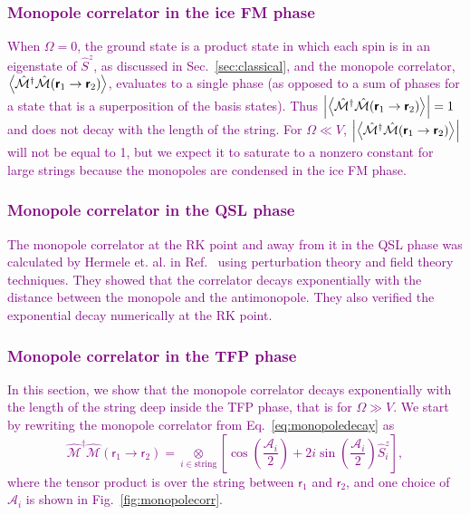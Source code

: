 \documentclass[twocolumn,superscriptaddress,amsmath,amssymb,aps,prx,nofootinbib]{revtex4-2}
\newcommand{\dual}[1]{\boldsymbol{\mathsf{#1}}}
\newcommand{\newtext}[1]{\textcolor{purple}{#1}}
\begin{document}
\newtext{\subsubsection{Monopole correlator in the ice FM phase}} \label{sec:monopole_corr_ice_fm}

\newtext{When $\Omega = 0$, the ground state is a product state in which each spin is in an eigenstate of $\hat{S}^z$, as discussed in Sec.~\ref{sec:classical}, and the monopole correlator, $\expval{\hat{\mathcal{M}}^\dagger \hat{\mathcal{M}} (\dual{r}_1 \rightarrow \dual{r}_2) }$, evaluates to a single phase (as opposed to a sum of phases for a state that is a superposition of the basis states). Thus $\abs{\expval{\hat{\mathcal{M}}^\dagger \hat{\mathcal{M}} (\dual{r}_1 \rightarrow \dual{r}_2) }} = 1$ and does not decay with the length of the string. For $\Omega \ll V$, $\abs{ \expval{\hat{\mathcal{M}}^\dagger \hat{\mathcal{M}} (\dual{r}_1 \rightarrow \dual{r}_2) }} $ will not be equal to 1, but we expect it to saturate to a nonzero constant for large strings  because the monopoles are condensed in the ice FM phase. }

\newtext{\subsubsection{Monopole correlator in the QSL phase}}
\label{sec:monopole_corr_qsl}

\newtext{The monopole correlator at the RK point and away from it in the QSL phase was calculated by Hermele et. al. in Ref.~\cite{hermele2004} using perturbation theory and field theory techniques. They showed that the correlator decays exponentially with the distance between the monopole and the antimonopole. They also verified the exponential decay numerically at the RK point.}

\newtext{\subsubsection{Monopole correlator in the TFP phase}}
\label{sec:monopole_corr_tfp}

\newtext{In this section, we show that the monopole correlator decays exponentially with the length of the string deep inside the TFP phase, that is for $\Omega \gg V$. We start by rewriting the monopole correlator from Eq.~\eqref{eq:monopoledecay} as
\begin{equation}
    \label{eq:monopoledecay2}
        \hat{\mathcal{M}}^\dagger \hat{\mathcal{M}} (\dual{r}_1\rightarrow \dual{r}_2)=  \underset{i \in \text{string}}{\otimes} \left[ \cos\left( \frac{\mathcal{A}_{i}}{2} \right) + 2i  \sin\left( \frac{\mathcal{A}_{i}}{2} \right) \hat{S}^z_{i} \right],
\end{equation}
where the tensor product is over the string between $\dual{r}_1$ and $\dual{r}_2$, and one choice of $\mathcal{A}_i$ is shown in Fig.~\ref{fig:monopolecorr}.}
\end{document}
